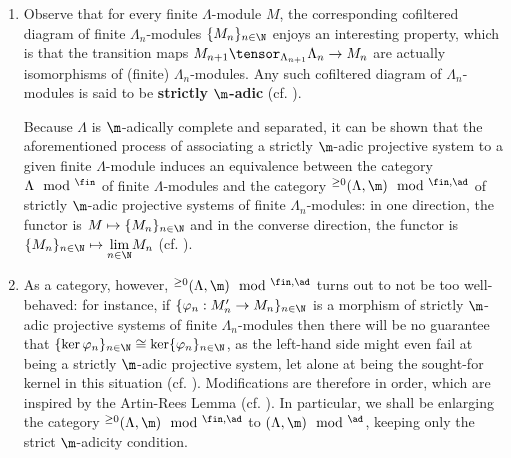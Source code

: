        \begin{remark} \label{remark: strictly_adic_projective_systems}
            \noindent
            \begin{enumerate}
                \item Observe that for every finite $\Lambda$-module $M$, the corresponding cofiltered diagram of finite $\Lambda_n$-modules $\{M_n\}_{n \in \N}$ enjoys an interesting property, which is that the transition maps $M_{n + 1} \tensor_{\Lambda_{n + 1}} \Lambda_n \to M_n$ are actually isomorphisms of (finite) $\Lambda_n$-modules. Any such cofiltered diagram of $\Lambda_n$-modules is said to be \textbf{strictly $\m$-adic} (cf. \cite[Definition 1.4.1.1]{conrad_etale_cohomology}). 
            
                Because $\Lambda$ is $\m$-adically complete and separated, it can be shown that the aforementioned process of associating a strictly $\m$-adic projective system to a given finite $\Lambda$-module induces an equivalence between the category $\Lambda\mod^{\fin}$ of finite $\Lambda$-modules and the category ${}^{\geq 0}(\Lambda, \m)\mod^{\fin, \ad}$ of strictly $\m$-adic projective systems of finite $\Lambda_n$-modules: in one direction, the functor is $M \mapsto \{M_n\}_{n \in \N}$ and in the converse direction, the functor is $\{M_n\}_{n \in \N} \mapsto \underset{n \in \N}{\lim} M_n$ (cf. \cite[\href{https://stacks.math.columbia.edu/tag/031D}{Tag 031D}]{stacks}).
                \item As a category, however, ${}^{\geq 0}(\Lambda, \m)\mod^{\fin, \ad}$ turns out to not be too well-behaved: for instance, if $\{\varphi_n: M'_n \to M_n\}_{n \in \N}$ is a morphism of strictly $\m$-adic projective systems of finite $\Lambda_n$-modules then there will be no guarantee that $\{\ker \varphi_n\}_{n \in \N} \cong \ker \{\varphi_n\}_{n \in \N}$, as the left-hand side might even fail at being a strictly $\m$-adic projective system, let alone at being the sought-for kernel in this situation (cf. \cite[Example 1.4.1.3]{conrad_etale_cohomology}). Modifications are therefore in order, which are inspired by the Artin-Rees Lemma (cf. \cite[Example 1.4.1.4]{conrad_etale_cohomology}). In particular, we shall be enlarging the category ${}^{\geq 0}(\Lambda, \m)\mod^{\fin, \ad}$ to $(\Lambda, \m)\mod^{\ad}$, keeping only the strict $\m$-adicity condition. 
            \end{enumerate}
        \end{remark}